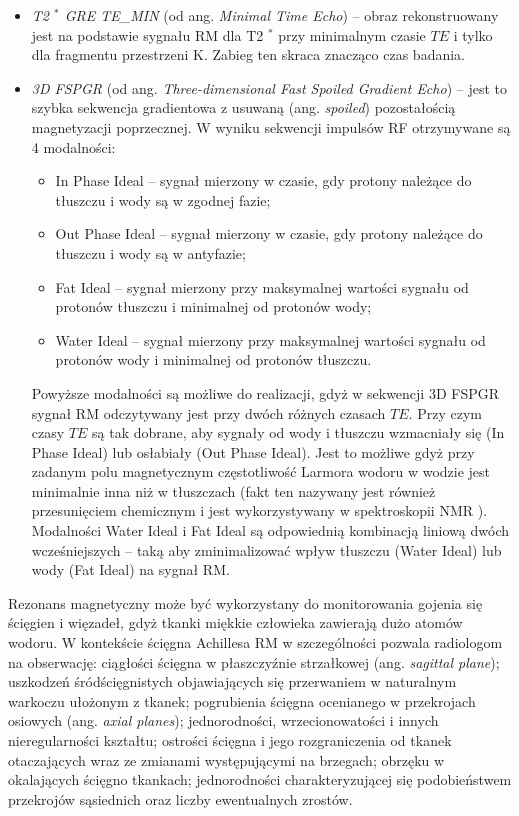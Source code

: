\begin{itemize}
	\item \textit{T2 $^\ast$ GRE TE\_MIN} (od ang. \textit{Minimal Time Echo}) -- obraz rekonstruowany jest na podstawie sygnału RM dla T2 $^\ast$  przy minimalnym czasie $TE$ i tylko dla fragmentu przestrzeni K. Zabieg ten skraca znacząco czas badania.
	\item \textit{3D FSPGR} (od ang. \textit{Three-dimensional Fast Spoiled Gradient Echo}) -- jest to szybka sekwencja gradientowa z usuwaną (ang. \textit{spoiled}) pozostałością magnetyzacji poprzecznej. W wyniku sekwencji impulsów RF otrzymywane są 4 modalności: 
	\begin{itemize}
		\item In Phase Ideal -- sygnał mierzony w czasie, gdy protony należące do tłuszczu i wody są w zgodnej fazie;
		\item Out Phase Ideal -- sygnał mierzony w czasie, gdy protony należące do tłuszczu i wody są w antyfazie;
		\item Fat Ideal -- sygnał mierzony przy maksymalnej wartości sygnału od protonów tłuszczu i minimalnej od protonów wody;
		\item Water Ideal -- sygnał mierzony przy maksymalnej wartości sygnału od protonów wody i minimalnej od protonów tłuszczu.
	\end{itemize}
	Powyższe modalności są możliwe do realizacji, gdyż w sekwencji 3D FSPGR sygnał RM odczytywany jest przy dwóch różnych czasach $TE$. Przy czym czasy $TE$ są tak dobrane, aby sygnały od wody i tłuszczu wzmacniały się (In Phase Ideal) lub osłabiały (Out Phase Ideal). Jest to możliwe gdyż przy zadanym polu magnetycznym częstotliwość Larmora wodoru w wodzie jest minimalnie inna niż w tłuszczach (fakt ten nazywany jest również przesunięciem chemicznym i jest wykorzystywany w spektroskopii NMR \cite{lide2006crc}). Modalności Water Ideal i Fat Ideal są odpowiednią kombinacją liniową dwóch wcześniejszych -- taką aby zminimalizować wpływ tłuszczu (Water Ideal) lub wody (Fat Ideal) na sygnał RM.
\end{itemize}

Rezonans magnetyczny może być wykorzystany do monitorowania gojenia się ścięgien i więzadeł, gdyż tkanki miękkie człowieka zawierają dużo atomów wodoru. W kontekście ścięgna Achillesa RM w szczególności pozwala radiologom na obserwację: ciągłości ścięgna w płaszczyźnie strzałkowej (ang. \textit{sagittal plane}); uszkodzeń śródścięgnistych objawiających się przerwaniem w naturalnym warkoczu ułożonym z tkanek; pogrubienia ścięgna ocenianego w przekrojach osiowych (ang. \textit{axial planes}); jednorodności, wrzecionowatości i innych nieregularności kształtu; ostrości ścięgna i jego rozgraniczenia od tkanek otaczających wraz ze zmianami występującymi na brzegach; obrzęku w okalających ścięgno tkankach; jednorodności charakteryzującej się podobieństwem przekrojów sąsiednich oraz liczby ewentualnych zrostów.

